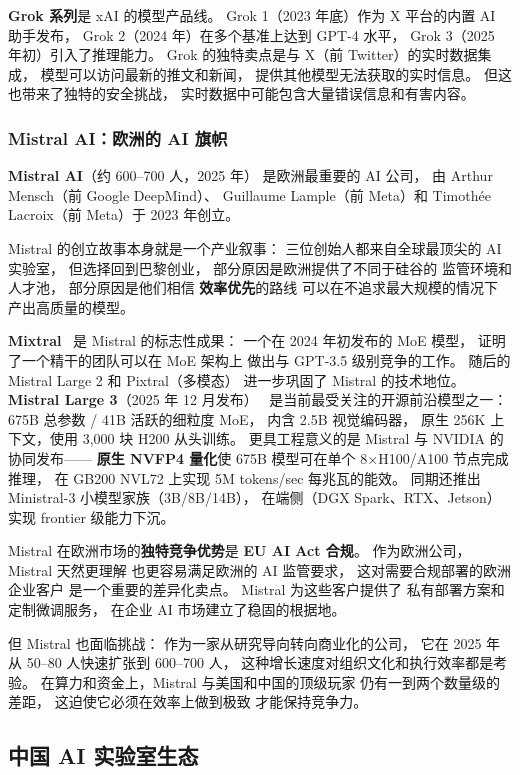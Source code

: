 \textbf{Grok 系列}是 xAI 的模型产品线。
Grok 1（2023 年底）作为 X 平台的内置 AI 助手发布，
Grok 2（2024 年）在多个基准上达到 GPT-4 水平，
Grok 3（2025 年初）引入了推理能力。
Grok 的独特卖点是与 X（前 Twitter）的实时数据集成，
模型可以访问最新的推文和新闻，
提供其他模型无法获取的实时信息。
但这也带来了独特的安全挑战，
实时数据中可能包含大量错误信息和有害内容。

\subsubsection{Mistral AI：欧洲的 AI 旗帜}

\textbf{Mistral AI}（约 600--700 人，2025 年）
是欧洲最重要的 AI 公司，
由 Arthur Mensch（前 Google DeepMind）、
Guillaume Lample（前 Meta）和
Timoth\'{e}e Lacroix（前 Meta）于 2023 年创立。

Mistral 的创立故事本身就是一个产业叙事：
三位创始人都来自全球最顶尖的 AI 实验室，
但选择回到巴黎创业，
部分原因是欧洲提供了不同于硅谷的
监管环境和人才池，
部分原因是他们相信
\textbf{效率优先}的路线
可以在不追求最大规模的情况下
产出高质量的模型。

\textbf{Mixtral}~\cite{jiang2024mixtral} 是 Mistral 的标志性成果：
一个在 2024 年初发布的 MoE 模型，
证明了一个精干的团队可以在 MoE 架构上
做出与 GPT-3.5 级别竞争的工作。
随后的 Mistral Large 2 和 Pixtral（多模态）
进一步巩固了 Mistral 的技术地位。
\textbf{Mistral Large 3}（2025 年 12 月发布）~\cite{mistral_large3_2025}
是当前最受关注的开源前沿模型之一：
675B 总参数 / 41B 活跃的细粒度 MoE，
内含 2.5B 视觉编码器，
原生 256K 上下文，使用 3,000 块 H200 从头训练。
更具工程意义的是 Mistral 与 NVIDIA 的协同发布——
\textbf{原生 NVFP4 量化}使 675B 模型可在单个 8$\times$H100/A100 节点完成推理，
在 GB200 NVL72 上实现 5M tokens/sec 每兆瓦的能效。
同期还推出 Ministral-3 小模型家族（3B/8B/14B），
在端侧（DGX Spark、RTX、Jetson）实现 frontier 级能力下沉。

Mistral 在欧洲市场的\textbf{独特竞争优势}是
\textbf{EU AI Act 合规}。
作为欧洲公司，Mistral 天然更理解
也更容易满足欧洲的 AI 监管要求，
这对需要合规部署的欧洲企业客户
是一个重要的差异化卖点。
Mistral 为这些客户提供了
私有部署方案和定制微调服务，
在企业 AI 市场建立了稳固的根据地。

但 Mistral 也面临挑战：
作为一家从研究导向转向商业化的公司，
它在 2025 年从 50--80 人快速扩张到 600--700 人，
这种增长速度对组织文化和执行效率都是考验。
在算力和资金上，Mistral 与美国和中国的顶级玩家
仍有一到两个数量级的差距，
这迫使它必须在效率上做到极致
才能保持竞争力。

\subsection{中国 AI 实验室生态}
\label{sec:chinese-labs}

